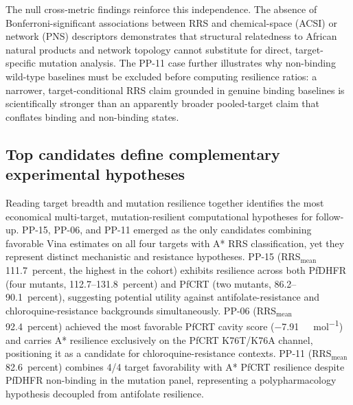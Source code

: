 \documentclass[journal=jcisd8,manuscript=article]{achemso}
\begin{document}
The null cross-metric findings reinforce this independence. The absence of Bonferroni-significant associations between RRS and chemical-space (ACSI) or network (PNS) descriptors demonstrates that structural relatedness to African natural products and network topology cannot substitute for direct, target-specific mutation analysis. The PP-11 case further illustrates why non-binding wild-type baselines must be excluded before computing resilience ratios: a narrower, target-conditional RRS claim grounded in genuine binding baselines is scientifically stronger than an apparently broader pooled-target claim that conflates binding and non-binding states.

\subsection{Top candidates define complementary experimental hypotheses}
Reading target breadth and mutation resilience together identifies the most economical multi-target, mutation-resilient computational hypotheses for follow-up. PP-15, PP-06, and PP-11 emerged as the only candidates combining favorable Vina estimates on all four targets with A* RRS classification, yet they represent distinct mechanistic and resistance hypotheses. PP-15 (RRS$_{\mathrm{mean}}$ \num{111.7}~percent, the highest in the cohort) exhibits resilience across both PfDHFR (four mutants, \numrange{112.7}{131.8}~percent) and PfCRT (two mutants, \num{86.2}--\num{90.1}~percent), suggesting potential utility against antifolate-resistance and chloroquine-resistance backgrounds simultaneously. PP-06 (RRS$_{\mathrm{mean}}$ \num{92.4}~percent) achieved the most favorable PfCRT cavity score (\num{-7.91}~\si{\kilo\calorie\per\mole}) and carries A* resilience exclusively on the PfCRT K76T/K76A channel, positioning it as a candidate for chloroquine-resistance contexts. PP-11 (RRS$_{\mathrm{mean}}$ \num{82.6}~percent) combines 4/4 target favorability with A* PfCRT resilience despite PfDHFR non-binding in the mutation panel, representing a polypharmacology hypothesis decoupled from antifolate resilience.
\end{document}
